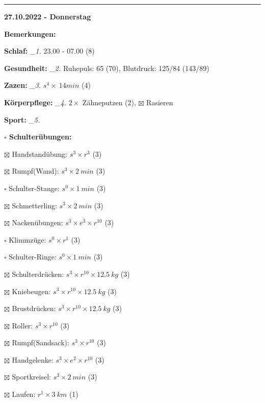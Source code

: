 \documentclass[10pt,a4paper]{article}
\newcommand\prop[1] {{\color {alizarin} {\bf #1}}}             %
\newcommand\rele[1] {{\color {english} \bf {#1}}}              %
\newcommand\mand[1] {{\color {burntorange} {\bf #1}}}          %
\newcommand\ddivide {\vskip -9pt \hrule \vskip 6pt}
\newcommand\topspace{\vskip -15pt \hskip 20pt}
\newcommand\n[1] { {\sl #1.} \hskip 5pt }
\begin{document}
\ddivide
{\rele {27.10.2022 - Donnerstag}}

\begin{mdframed}[style=daystyle]
  \begin{labeling}{{\mand {Bemerkungen:}}}
    \setlength\itemsep{-3pt}
  \item[{\mand {Schlaf:}}]        \n{\_1} 23.00 - 07.00 (8)
  \item[{\mand {Gesundheit:}}]    \n{\_2} Ruhepuls: 65 (70), Blutdruck: 125/84 (143/89)
  \item[{\mand {Zazen:}}]         \n{\_3} $s^4 \times\ 14 min$ (4)
  \item[{\mand {Körperpflege:}}]  \n{\_4} $2 \times$ Zähneputzen (2), $\boxtimes$ Rasieren
  \item[{\mand {Sport:}}]         \n{\_5}
    \topspace
    \begin{minipage}{0.75\textwidth}  
      \begin{labeling}{\prop {$\square$ {Schulterübungen:}}} 
        \setlength\itemsep{-3pt}
      \item[$\boxtimes$ Handstandübung:]  $s^3 \times r^{3}$ (3)
      \item[$\boxtimes$ Rumpf(Wand):]     $s^3 \times 2\ min$ (3)
      \item[$\square$ Schulter-Stange:] $s^0 \times 1\ min$ (3)
      \item[$\boxtimes$ Schmetterling:]   $s^3 \times 2\ min$ (3)
      \item[$\boxtimes$ Nackenübungen:]   $s^3 \times e^3 \times r^{10}$ (3)
      \item[$\square$ Klimmzüge:]       $s^0 \times r^1$ (3)
      \item[$\square$ Schulter-Ringe:]  $s^0 \times 1\ min$ (3)
      \item[$\boxtimes$ Schulterdrücken:] $s^3 \times r^{10} \times 12.5\ kg$ (3)
      \item[$\boxtimes$ Kniebeugen:]      $s^3 \times r^{10} \times 12.5\ kg$ (3)
      \item[$\boxtimes$ Brustdrücken:]    $s^3 \times r^{10} \times 12.5\ kg$ (3)
      \item[$\boxtimes$ Roller:]          $s^3 \times r^{10}$ (3)
      \item[$\boxtimes$ Rumpf(Sandsack):] $s^3 \times r^{10}$ (3)
      \item[$\boxtimes$ Handgelenke:]     $s^3 \times e^2 \times r^{10}$ (3)
      \item[$\boxtimes$ Sportkreisel:]    $s^3 \times 2\ min$ (3)
      \item[$\boxtimes$ Laufen:]          $r^1 \times 3\ km$ (1)

\end{labeling}
\end{minipage}
\end{labeling}
\end{mdframed}
\end{document}
